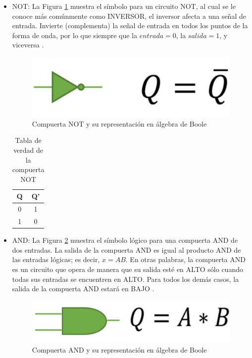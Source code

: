 \documentclass[journal]{IEEEtran}
\begin{document}
	\begin{itemize}
		\item NOT: La Figura \ref{fig:NOT} muestra el símbolo para un circuito NOT, al cual se le conoce más comúnmente como INVERSOR, el inversor afecta a una señal de entrada. Invierte (complementa) la señal de entrada en todos los puntos de la forma de onda, por lo que siempre que la $entrada = 0$, la $salida = 1$, y viceversa \cite{Tocci2007}.
		
		\begin{figure}
			\centering
			\includegraphics[scale = 0.5]{img/NOT.png}
			\caption{Compuerta NOT y su representación en álgebra de Boole \cite{Tocci2007}}
			\label{fig:NOT}
		\end{figure}
		
		\begin{table}[!htb]
			\centering
			\begin{tabular}{|c|c|}
				\hline
				Q & Q' \\
				\hline
				\hline
				0 & 1 \\
				\hline
				1 & 0 \\
				\hline
			\end{tabular}
			\caption{Tabla de verdad de la compuerta NOT}
			\label{tab:NOT}
		\end{table}
		
		\item AND: La Figura \ref{fig:AND} muestra el símbolo lógico para una compuerta AND de dos entradas. La salida de la compuerta AND es igual al producto AND de las entradas lógicas; es decir, $x=AB$. En otras palabras, la compuerta AND es un circuito que opera de manera que su salida esté en ALTO sólo cuando todas sus entradas se encuentren en ALTO. Para todos los demás casos, la salida de la compuerta AND estará en BAJO \cite{Tocci2007}.
		
		\begin{figure}[!htb]
			\centering
			\includegraphics[scale = 0.3]{img/AND.png}
			\caption{Compuerta AND y su representación en álgebra de Boole \cite{Tocci2007}}
			\label{fig:AND}
		\end{figure}
		

\end{itemize}
\end{document}
